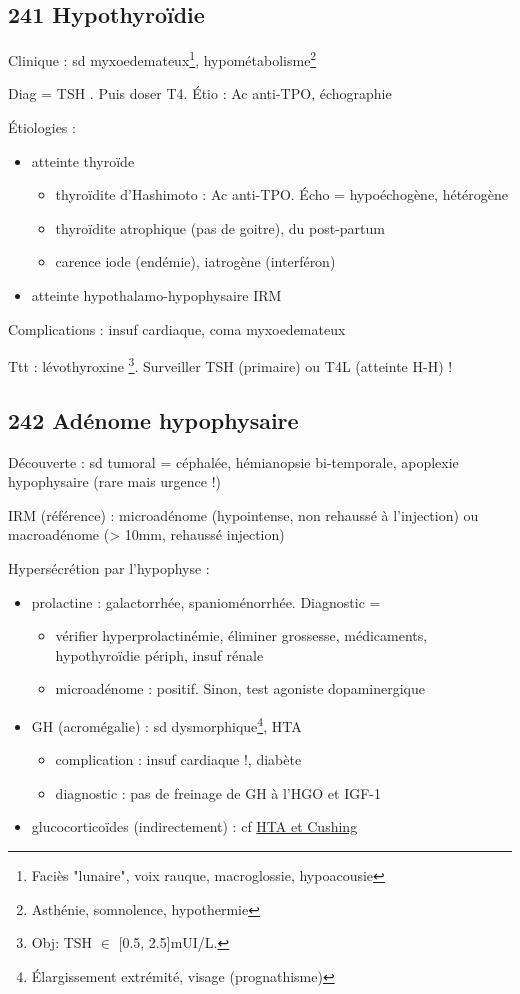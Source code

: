 \documentclass[11pt]{article}
\begin{document}
\subsection{241 Hypothyroïdie}
\label{sec:org7283262}
Clinique : sd myxoedemateux\footnote{Faciès "lunaire", voix rauque, macroglossie, hypoacousie}, hypométabolisme\footnote{Asthénie, somnolence, hypothermie}

Diag = TSH \inc. Puis doser T4. Étio : Ac anti-TPO, échographie

Étiologies :
\begin{itemize}
\item atteinte thyroïde
\begin{itemize}
\item thyroïdite d'Hashimoto : Ac anti-TPO. Écho = hypoéchogène, hétérogène
\item thyroïdite atrophique (pas de goitre), du post-partum
\item carence iode (endémie), iatrogène (interféron)
\end{itemize}
\item atteinte hypothalamo-hypophysaire \thus IRM
\end{itemize}

Complications : insuf cardiaque, coma myxoedemateux \faBomb 

Ttt : lévothyroxine \footnote{Obj: TSH \(\in\) [0.5, 2.5]mUI/L.}. Surveiller TSH (primaire) ou T4L (atteinte H-H) !

\subsection{242 Adénome hypophysaire}
\label{sec:org9c6da25}
Découverte : sd tumoral = céphalée, hémianopsie bi-temporale, apoplexie
hypophysaire (rare mais urgence !)

IRM (référence) : microadénome (hypointense, non rehaussé à l'injection) ou
macroadénome (> 10mm, rehaussé injection)

Hypersécrétion par l'hypophyse :
\begin{itemize}
\item prolactine : galactorrhée, spanioménorrhée. Diagnostic = 
\begin{itemize}
\item vérifier hyperprolactinémie, éliminer grossesse,  médicaments, hypothyroïdie
périph, insuf rénale
\item microadénome : positif. Sinon, test agoniste dopaminergique
\end{itemize}
\item GH (acromégalie) : sd dysmorphique\footnote{Élargissement extrémité, visage (prognathisme)}, HTA
\begin{itemize}
\item complication : insuf cardiaque !, diabète
\item diagnostic : pas de freinage de GH à l'HGO et \inc{} IGF-1
\end{itemize}
\item glucocorticoïdes (indirectement) : cf \hyperref[org8289fb5]{HTA et Cushing}
\end{itemize}
\end{document}
